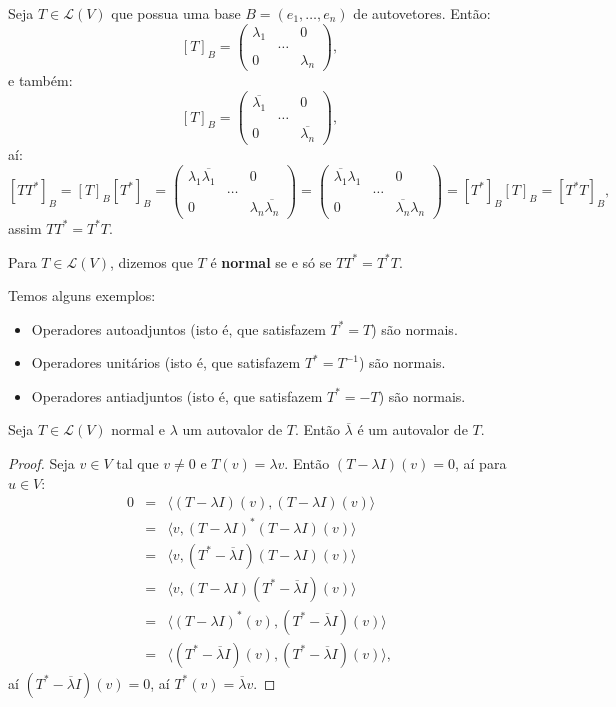 \documentclass[11pt,twoside,a4paper]{book}
\begin{document}
\medskip
\noindent
Seja $T\in\mathcal{L}(V)$ que possua uma base $B=(e_1,\dots,e_n)$ de autovetores. Então:
\[
[T]_B=\begin{pmatrix}
\lambda_1&&0\\&\dots&\\0&&\lambda_n
\end{pmatrix},
\]
e também:
\[
[T]_B=\begin{pmatrix}
\overline{\lambda_1}&&0\\&\dots&\\0&&\overline{\lambda_n}
\end{pmatrix},
\]
aí:
\[
[TT^*]_B=[T]_B[T^*]_B=\begin{pmatrix}
\lambda_1\overline{\lambda_1}&&0\\&\dots&\\0&&\lambda_n\overline{\lambda_n}
\end{pmatrix}=\begin{pmatrix}
\overline{\lambda_1}\lambda_1&&0\\&\dots&\\0&&\overline{\lambda_n}\lambda_n
\end{pmatrix}=[T^*]_B[T]_B=[T^*T]_B,
\]
assim $TT^*=T^*T$.

\begin{definicao}
Para $T\in\mathcal{L}(V)$, dizemos que $T$ é \textbf{normal} se e só se $TT^*=T^*T$.
\end{definicao}

\begin{exemplo}
Temos alguns exemplos:
\begin{itemize}
\item Operadores autoadjuntos (isto é, que satisfazem $T^*=T$) são normais.
\item Operadores unitários (isto é, que satisfazem $T^*=T^{-1}$) são normais.
\item Operadores antiadjuntos (isto é, que satisfazem $T^*=-T$) são normais.
\end{itemize}
\end{exemplo}

\begin{lema}
Seja $T\in\mathcal{L}(V)$ normal e $\lambda$ um autovalor de $T$. Então $\overline{\lambda}$ é um autovalor de $T$.
\end{lema}
\begin{proof}
Seja $v\in V$ tal que $v\neq 0$ e $T(v)=\lambda v$. Então $(T-\lambda I)(v)=0$, aí para $u\in V$:
\[
\begin{array}{rcl}
0&=&\langle(T-\lambda I)(v),(T-\lambda I)(v)\rangle\\
&=&\langle v,(T-\lambda I)^*(T-\lambda I)(v)\rangle\\
&=&\langle v,(T^*-\overline{\lambda}I)(T-\lambda I)(v)\rangle\\
&=&\langle v,(T-\lambda I)(T^*-\overline{\lambda}I)(v)\rangle\\
&=&\langle (T-\lambda I)^*(v),(T^*-\overline{\lambda}I)(v)\rangle\\
&=&\langle (T^*-\overline{\lambda}I)(v),(T^*-\overline{\lambda}I)(v)\rangle,
\end{array}
\]
aí $(T^*-\overline{\lambda}I)(v)=0$, aí $T^*(v)=\overline{\lambda}v$.
\end{proof}
\end{document}
